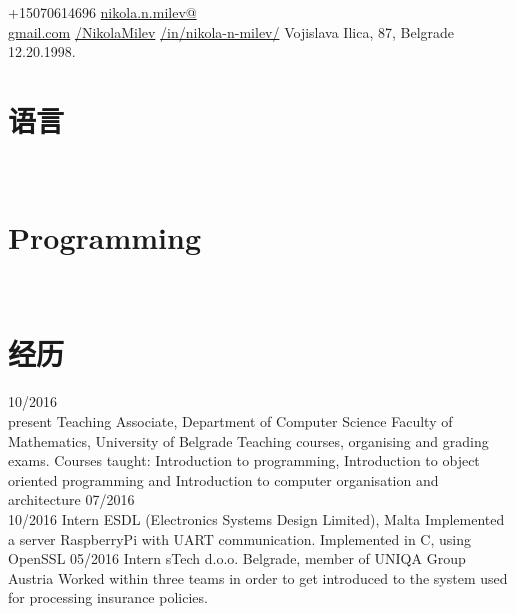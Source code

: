 \documentclass[a4paper]{my_cv}
\newcommand{\hei}{\CJKfamily{hei}}                          %
\newcommand{\ahei}{\CJKfamily{ahei}}
\newcommand{\xiaoerhao}{\fontsize{18pt}{\baselineskip}\selectfont}  %
\begin{document}
\thispagestyle{empty}	
\pageheader{\ahei 令~}{\hei 平子}
	{+15070614696}
 	{\href{mailto:nikola.n.milev@gmail.com}{nikola.n.milev@\\gmail.com}}
	{ \href{https://github.com/NikolaMilev}{/NikolaMilev}} 	
 	{ \href{https://www.linkedin.com/in/nikola-n-milev/}{/in/nikola-n-milev/}}
	{ Vojislava Ilica, 87, Belgrade }
	{12.20.1998.}


 
\begin{aside}
\section{\hei \xiaoerhao 语言}
\bodyfont{}
~
~
\section{Programming}
\end {aside}
~
~\\
\section{\hei 经历 }
\begin{entrylist}
\entry
    {10/2016~\textemdash \\present}
    {Teaching Associate, Department of Computer Science}
    {Faculty of Mathematics, University of Belgrade}
    {Teaching courses, organising and grading exams. Courses taught: Introduction to programming, Introduction to object oriented programming and Introduction to computer organisation and architecture}
\entry
    {07/2016~\textemdash \\10/2016}
    {Intern}
    {ESDL (Electronics Systems Design Limited), Malta}
    {Implemented a server RaspberryPi with UART communication. Implemented in C, using OpenSSL}
\entry
    {05/2016}
    {Intern}
    {sTech d.o.o. Belgrade, member of UNIQA Group Austria}
    {Worked within three teams in order to get introduced to the system used for processing insurance policies. }
\end{entrylist}
\end{document}
